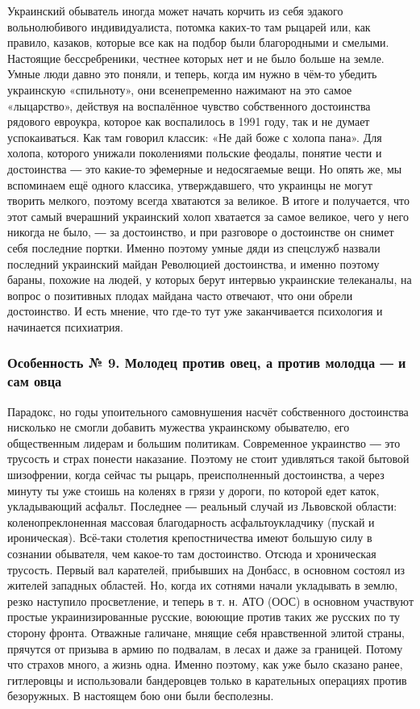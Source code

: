 Украинский обыватель иногда может начать корчить из себя эдакого вольнолюбивого
индивидуалиста, потомка каких-то там рыцарей или, как правило, казаков, которые
все как на подбор были благородными и смелыми. Настоящие бессребреники, честнее
которых нет и не было больше на земле. Умные люди давно это поняли, и теперь,
когда им нужно в чём-то убедить украинскую «спильноту», они всенепременно
нажимают на это самое «лыцарство», действуя на воспалённое чувство собственного
достоинства рядового евроукра, которое как воспалилось в 1991 году, так и не
думает успокаиваться. Как там говорил классик: «Не дай боже с холопа пана». Для
холопа, которого унижали поколениями польские феодалы, понятие чести и
достоинства ― это какие-то эфемерные и недосягаемые вещи. Но опять же, мы
вспоминаем ещё одного классика, утверждавшего, что украинцы не могут творить
мелкого, поэтому всегда хватаются за великое. В итоге и получается, что этот
самый вчерашний украинский холоп хватается за самое великое, чего у него
никогда не было, ― за достоинство, и при разговоре о достоинстве он снимет себя
последние портки. Именно поэтому умные дяди из спецслужб назвали последний
украинский майдан Революцией достоинства, и именно поэтому бараны, похожие на
людей, у которых берут интервью украинские телеканалы, на вопрос о позитивных
плодах майдана часто отвечают, что они обрели достоинство. И есть мнение, что
где-то тут уже заканчивается психология и начинается психиатрия.

\subsubsection{Особенность № 9. Молодец против овец, а против молодца ― и сам овца}

Парадокс, но годы упоительного самовнушения насчёт собственного достоинства
нисколько не смогли добавить мужества украинскому обывателю, его общественным
лидерам и большим политикам. Современное украинство ― это трусость и страх
понести наказание. Поэтому не стоит удивляться такой бытовой шизофрении, когда
сейчас ты рыцарь, преисполненный достоинства, а через минуту ты уже стоишь на
коленях в грязи у дороги, по которой едет каток, укладывающий асфальт.
Последнее ― реальный случай из Львовской области: коленопреклоненная массовая
благодарность асфальтоукладчику (пускай и ироническая). Всё-таки столетия
крепостничества имеют большую силу в сознании обывателя, чем какое-то там
достоинство. Отсюда и хроническая трусость. Первый вал карателей, прибывших на
Донбасс, в основном состоял из жителей западных областей. Но, когда их сотнями
начали укладывать в землю, резко наступило просветление, и теперь в т. н. АТО
(ООС) в основном участвуют простые украинизированные русские, воюющие против
таких же русских по ту сторону фронта. Отважные галичане, мнящие себя
нравственной элитой страны, прячутся от призыва в армию по подвалам, в лесах и
даже за границей. Потому что страхов много, а жизнь одна. Именно поэтому, как
уже было сказано ранее, гитлеровцы и использовали бандеровцев только в
карательных операциях против безоружных. В настоящем бою они были бесполезны.

